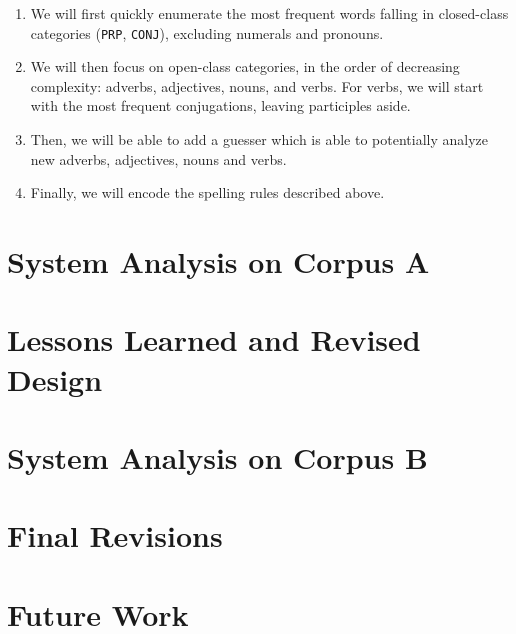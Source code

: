 \documentclass[11pt,letterpaper]{article}
\begin{document}
\begin{enumerate}
  \item We will first quickly enumerate the most frequent words falling in closed-class categories (\texttt{PRP}, \texttt{CONJ}), excluding numerals and pronouns.
  \item We will then focus on open-class categories, in the order of decreasing complexity: adverbs, adjectives, nouns, and verbs. For verbs, we will start with the most frequent conjugations, leaving participles aside.
  \item Then, we will be able to add a guesser which is able to potentially analyze new adverbs, adjectives, nouns and verbs.
  \item Finally, we will encode the spelling rules described above.
\end{enumerate}

\section{System Analysis on Corpus A}

\section{Lessons Learned and Revised Design}

\section{System Analysis on Corpus B}

\section{Final Revisions}

\section{Future Work}




\label{lastpage}
\end{document}
